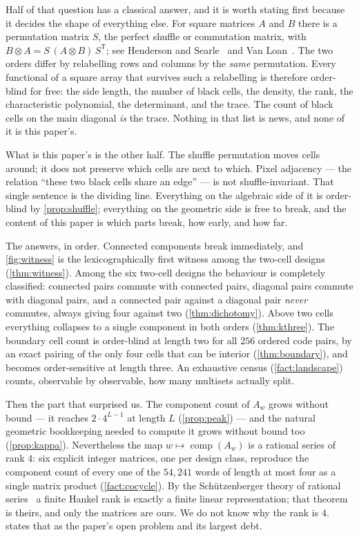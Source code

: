 \documentclass[11pt]{amsart}
\theoremstyle{definition}
\theoremstyle{remark}
\begin{document}
Half of that question has a classical answer, and it is worth stating first because it decides the shape of everything else. For square matrices $A$ and $B$ there is a permutation matrix $S$, the perfect shuffle or commutation matrix, with $B \otimes A = S\,(A \otimes B)\,S^{\mathsf T}$; see Henderson and Searle~\cite{hendersonsearle} and Van Loan~\cite{vanloan}. The two orders differ by relabelling rows and columns by the \emph{same} permutation. Every functional of a square array that survives such a relabelling is therefore order-blind for free: the side length, the number of black cells, the density, the rank, the characteristic polynomial, the determinant, and the trace. The count of black cells on the main diagonal \emph{is} the trace. Nothing in that list is news, and none of it is this paper's.

What is this paper's is the other half. The shuffle permutation moves cells around; it does not preserve which cells are next to which. Pixel adjacency --- the relation ``these two black cells share an edge'' --- is not shuffle-invariant. That single sentence is the dividing line. Everything on the algebraic side of it is order-blind by \cref{prop:shuffle}; everything on the geometric side is free to break, and the content of this paper is which parts break, how early, and how far.

The answers, in order. Connected components break immediately, and \cref{fig:witness} is the lexicographically first witness among the two-cell designs (\cref{thm:witness}). Among the six two-cell designs the behaviour is completely classified: connected pairs commute with connected pairs, diagonal pairs commute with diagonal pairs, and a connected pair against a diagonal pair \emph{never} commutes, always giving four against two (\cref{thm:dichotomy}). Above two cells everything collapses to a single component in both orders (\cref{thm:kthree}). The boundary cell count is order-blind at length two for all $256$ ordered code pairs, by an exact pairing of the only four cells that can be interior (\cref{thm:boundary}), and becomes order-sensitive at length three. An exhaustive census (\cref{fact:landscape}) counts, observable by observable, how many multisets actually split.

Then the part that surprised us. The component count of $A_w$ grows without bound --- it reaches $2 \cdot 4^{L-1}$ at length $L$ (\cref{prop:peak}) --- and the natural geometric bookkeeping needed to compute it grows without bound too (\cref{prop:kappa}). Nevertheless the map $w \mapsto \operatorname{comp}(A_w)$ is a rational series of rank $4$: six explicit integer matrices, one per design class, reproduce the component count of every one of the $54{,}241$ words of length at most four as a single matrix product (\cref{fact:cocycle}). By the Schützenberger theory of rational series~\cite{schutzenberger,berstelreutenauer} a finite Hankel rank is exactly a finite linear representation; that theorem is theirs, and only the matrices are ours. We do not know why the rank is $4$.  states that as the paper's open problem and its largest debt.
\end{document}
